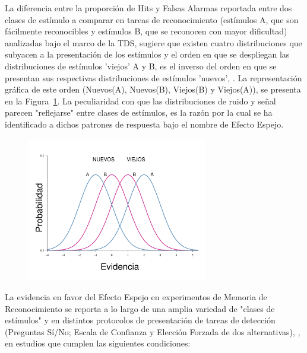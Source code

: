 La diferencia entre la proporción de Hits y Falsas Alarmas reportada entre dos clases de estímulo a comparar en tareas de reconocimiento (estímulos A, que son fácilmente reconocibles y estímulos B, que se reconocen con mayor dificultad) analizadas bajo el marco de la TDS, sugiere que existen cuatro distribuciones que subyacen a la presentación de los estímulos y el orden en que se despliegan las distribuciones de estímulos 'viejos' A y B, es el inverso del orden en que se presentan sus respectivas distribuciones de estímulos 'nuevos', \parencite{Glanzer1990, DeCarlo2007}. La representación gráfica de este orden (Nuevos(A), Nuevos(B), Viejos(B) y Viejos(A)), se presenta en la Figura~\ref{fig:Ejem_EfectoEspejo}. La peculiaridad con que las distribuciones de ruido y señal parecen "reflejarse" entre clases de estímulos, es la razón por la cual se ha identificado a dichos patrones de respuesta bajo el nombre de Efecto Espejo.\\

\begin{figure}[th]
\centering
\includegraphics[width=0.7\textwidth]{Figures/EfectoEspejo}
\caption[Representación gráfica del Efecto Espejo]{}
\label{fig:Ejem_EfectoEspejo}
\end{figure}

La evidencia en favor del Efecto Espejo en experimentos de Memoria de Reconocimiento se reporta a lo largo de una amplia variedad de "clases de estímulos" y en distintos protocolos de presentación de tareas de detección (Preguntas Sí/No; Escala de Confianza y Elección Forzada de dos alternativas), \parencite{Glanzer1990}, en estudios que cumplen las siguientes condiciones:\\

